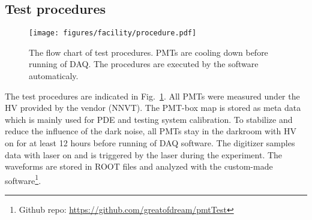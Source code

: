 \subsection{Test procedures}
\begin{figure}
    \centering
    \texttt{[image: figures/facility/procedure.pdf]}
    \caption{The flow chart of test procedures. PMTs are cooling down before running of DAQ. The procedures are executed by the software automaticaly.}
    \label{fig:testingprocedure}
\end{figure}

The test procedures are indicated in Fig.~\ref{fig:testingprocedure}. All PMTs were measured under the HV provided by the vendor (NNVT). The PMT-box map is stored as meta data which is mainly used for PDE and testing system calibration. To stabilize and reduce the influence of the dark noise, all PMTs stay in the darkroom with HV on for at least 12 hours before running of DAQ software. The digitizer samples data with laser on and is triggered by the laser during the experiment. The waveforms are stored in ROOT files and analyzed with the custom-made software\footnote{Github repo: \url{https://github.com/greatofdream/pmtTest}}.
